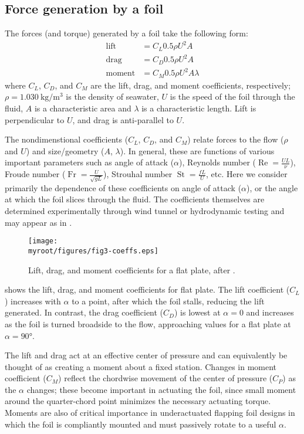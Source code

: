 \documentclass[twocolumn,10pt]{IEEEtran}
\newcommand{\myroot}{.}
\begin{document}
\subsection{Force generation by a foil}
The forces (and torque) generated by a foil take the following form:
\begin{align}
\mbox{lift} &= C_L 0.5\rho U^2 A \\
\mbox{drag} &= C_D 0.5\rho U^2 A \\
\mbox{moment} &= C_M 0.5\rho U^2 A \lambda
\end{align}
where $C_L$, $C_D$, and $C_M$ are the lift, drag, and moment coefficients, respectively; $\rho=\SI{1.030}{\kilo\gram\per\meter\cubed}$ is the density of seawater, $U$ is the speed of the foil through the fluid, $A$ is a characteristic area and $\lambda$ is a characteristic length. Lift is perpendicular to $U$, and drag is anti-parallel to $U$.

The nondimenstional coefficients ($C_L$, $C_D$, and $C_M$) relate forces to the flow ($\rho$ and $U$) and size/geometry ($A$, $\lambda$). In general, these are functions of various important parameters such as angle of attack ($\alpha$), Reynolds number ($\operatorname{Re}=\frac{UL}{\nu}$), Froude number ($\operatorname{Fr}=\frac{U}{\sqrt{gL}}$), Strouhal number $\operatorname{St}=\frac{fL}{U}$, etc. Here we consider primarily the dependence of these coefficients on angle of attack ($\alpha$), or the angle at which the foil slices through the fluid. The coefficients themselves are determined experimentally through wind tunnel or hydrodynamic testing and may appear as in . 
\begin{figure}
\begin{center}
\texttt{[image: \\myroot/figures/fig3-coeffs.eps]}
\end{center}
\caption{Lift, drag, and moment coefficients for a flat plate, after \cite{moore2014, cory2008, tangler2005}.}
\label{fig:intro-coeffs}
\end{figure}

 shows the lift, drag, and moment coefficients for flat plate. The lift coefficient ($C_L$) increases with $\alpha$ to a point, after which the foil stalls, reducing the lift generated. In contrast, the drag coefficient ($C_D$) is lowest at $\alpha=0$ and increases as the foil is turned broadside to the flow, approaching values for a flat plate at $\alpha=\ang{90}$. 

The lift and drag act at an effective center of pressure and can equivalently be thought of as creating a moment about a fixed station. Changes in moment coefficient ($C_M$) reflect the chordwise movement of the center of pressure ($C_P$) as the $\alpha$ changes; these become important in actuating the foil, since small moment around the quarter-chord point minimizes the necessary actuating torque. Moments are also of critical importance in underactuated flapping foil designs in which the foil is compliantly mounted and must passively rotate to a useful $\alpha$.
\end{document}
